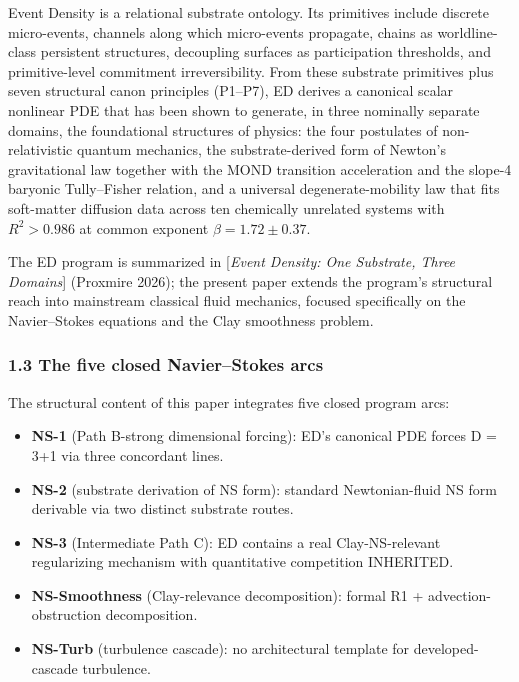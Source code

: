 \documentclass[
]{article}
\providecommand{\tightlist}{%
  \setlength{\itemsep}{0pt}\setlength{\parskip}{0pt}}
\begin{document}
Event Density is a relational substrate ontology. Its primitives include
discrete micro-events, channels along which micro-events propagate,
chains as worldline-class persistent structures, decoupling surfaces as
participation thresholds, and primitive-level commitment
irreversibility. From these substrate primitives plus seven structural
canon principles (P1--P7), ED derives a canonical scalar nonlinear PDE
that has been shown to generate, in three nominally separate domains,
the foundational structures of physics: the four postulates of
non-relativistic quantum mechanics, the substrate-derived form of
Newton's gravitational law together with the MOND transition
acceleration and the slope-4 baryonic Tully--Fisher relation, and a
universal degenerate-mobility law that fits soft-matter diffusion data
across ten chemically unrelated systems with \(R^2 > 0.986\) at common
exponent \(\beta = 1.72 \pm 0.37\).

The ED program is summarized in {[}\emph{Event Density: One Substrate,
Three Domains}{]} (Proxmire 2026); the present paper extends the
program's structural reach into mainstream classical fluid mechanics,
focused specifically on the Navier--Stokes equations and the Clay
smoothness problem.

\subsubsection{1.3 The five closed Navier--Stokes
arcs}\label{the-five-closed-navierstokes-arcs}

The structural content of this paper integrates five closed program
arcs:

\begin{itemize}
\tightlist
\item
  \textbf{NS-1} (Path B-strong dimensional forcing): ED's canonical PDE
  forces D = 3+1 via three concordant lines.
\item
  \textbf{NS-2} (substrate derivation of NS form): standard
  Newtonian-fluid NS form derivable via two distinct substrate routes.
\item
  \textbf{NS-3} (Intermediate Path C): ED contains a real
  Clay-NS-relevant regularizing mechanism with quantitative competition
  INHERITED.
\item
  \textbf{NS-Smoothness} (Clay-relevance decomposition): formal R1 +
  advection-obstruction decomposition.
\item
  \textbf{NS-Turb} (turbulence cascade): no architectural template for
  developed-cascade turbulence.
\end{itemize}
\end{document}
